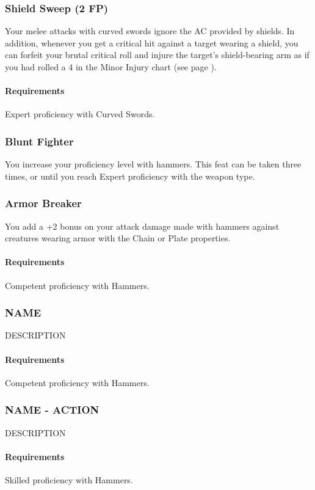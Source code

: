 \subsubsection{Shield Sweep (2 FP)} \label{feat::shieldsweep}
    Your melee attacks with curved swords ignore the AC provided by shields.
    In addition, whenever you get a critical hit against a target wearing a shield, you can forfeit your brutal critical roll and injure the target's shield-bearing arm as if you had rolled a 4 in the Minor Injury chart (see page \pageref{ssec::injuriesandinsanity}).
    \paragraph{Requirements} Expert proficiency with Curved Swords.
\subsubsection{Blunt Fighter} \label{feat::bluntfighter}
    You increase your proficiency level with hammers.
    This feat can be taken three times, or until you reach Expert proficiency with the weapon type.
\subsubsection{Armor Breaker} \label{feat::armorbreaker}
    You add a +2 bonus on your attack damage made with hammers against creatures wearing armor with the Chain or Plate properties.
    \paragraph{Requirements} Competent proficiency with Hammers.
\subsubsection{NAME} \label{feat::name}
    DESCRIPTION
    \paragraph{Requirements} Competent proficiency with Hammers.
\subsubsection{NAME - ACTION} \label{feat::name}
    DESCRIPTION
    \paragraph{Requirements} Skilled proficiency with Hammers.
